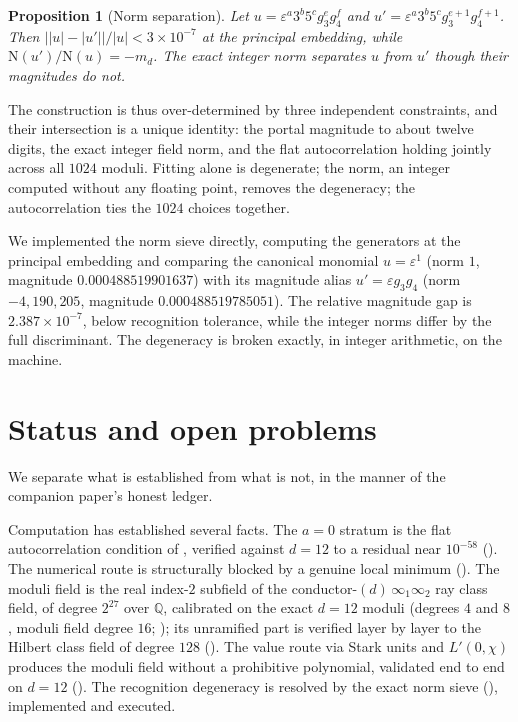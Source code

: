 \documentclass[12pt,a4paper]{article}
\newtheorem{proposition}[theorem]{Proposition}
\newcommand{\md}{m_d}
\newcommand{\Norm}{\mathrm{N}}
\begin{document}
\begin{proposition}[Norm separation]
\label{prop:sieve}
Let $u = \varepsilon^{a}3^{b}5^{c}g_3^{e}g_4^{f}$ and
$u' = \varepsilon^{a}3^{b}5^{c}g_3^{e+1}g_4^{f+1}$.  Then
$\big||u|-|u'|\big|/|u| < 3\times 10^{-7}$ at the principal embedding, while
$\Norm(u')/\Norm(u) = -\md$.  The exact integer norm separates $u$ from $u'$
though their magnitudes do not.
\end{proposition}

The construction is thus over-determined by three independent constraints, and
their intersection is a unique identity: the portal magnitude to about twelve
digits, the exact integer field norm, and the flat autocorrelation holding
jointly across all $1024$ moduli.  Fitting alone is degenerate; the norm, an
integer computed without any floating point, removes the degeneracy; the
autocorrelation ties the $1024$ choices together.

We implemented the norm sieve directly, computing the generators at the
principal embedding and comparing the canonical monomial
$u=\varepsilon^{1}$ (norm $1$, magnitude $0.000488519901637$) with its
magnitude alias $u'=\varepsilon g_3 g_4$ (norm $-4{,}190{,}205$, magnitude
$0.000488519785051$).  The relative magnitude gap is $2.387\times 10^{-7}$, below
recognition tolerance, while the integer norms differ by the full discriminant.
The degeneracy is broken exactly, in integer arithmetic, on the machine.

\section{Status and open problems}
\label{sec:status}

We separate what is established from what is not, in the manner of the companion
paper's honest ledger.

Computation has established several facts.  The $a=0$ stratum is the flat
autocorrelation condition of , verified against $d=12$ to a
residual near $10^{-58}$ ().  The numerical route is
structurally blocked by a genuine local minimum ().  The
moduli field is the real index-$2$ subfield of the
conductor-$(d)\,\infty_1\infty_2$ ray class field, of degree $2^{27}$ over
$\mathbb{Q}$, calibrated on the exact $d=12$ moduli (degrees $4$ and $8$,
moduli field degree $16$; ); its unramified part is verified layer by layer to the
Hilbert class field of degree $128$ ().  The value route via
Stark units and $L'(0,\chi)$ produces the moduli field without a prohibitive
polynomial, validated end to end on $d=12$ ().  The
recognition degeneracy is resolved by the exact norm sieve (),
implemented and executed.
\end{document}
